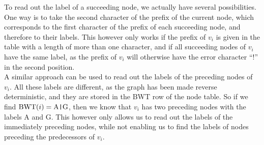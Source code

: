 \documentclass[a4paper,12pt,twoside,BCOR=10mm]{scrbook}
\def\pipe{\texttt{|}}
\begin{document}
To read out the label of a succeeding node, we actually have several possibilities.
One way is to take the second character of the prefix of the current node,
which corresponds to the first character of the prefix of each succeeding node,
and therefore to their labels. This however only works if the prefix of $ v_i $ is
given in the table with a length of more than one character, and if all succeeding nodes
of $ v_i $ have the same label, as the prefix of $ v_i $ will otherwise have the
error character “!” in the second position. \\
A similar approach can be used to read out the labels of the preceding nodes of $ v_i $.
All these labels are different, as the graph has been made reverse deterministic,
and they are stored in the BWT row of the node table. So if we find $ \textrm{BWT} ( i ) = \textrm{A{\pipe}G} $,
then we know that $ v_i $ has two preceding nodes with the labels A and G.
This however only allows us to read out the labels of the immediately preceding nodes,
while not enabling us to find the labels of nodes preceding the predecessors of $ v_i $.
\end{document}
